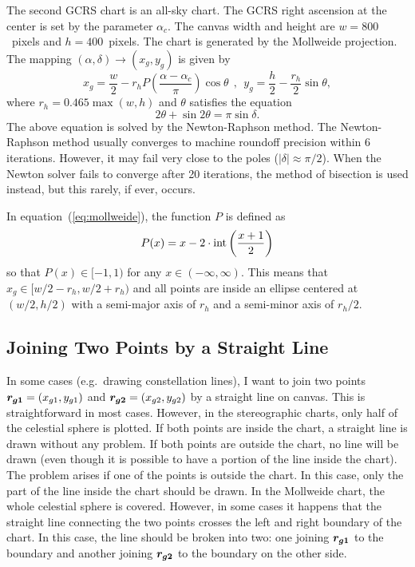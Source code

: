 \documentclass[12pt]{article}
\newcommand \beq {\begin{equation}}
\newcommand \eeq {\end{equation}}
\newcommand{\ve}[1]{\mbox{\boldmath $#1$}}
\begin{document}
The second GCRS chart is an all-sky chart. The GCRS right ascension at the center 
is set by the parameter $\alpha_c$. The canvas width and height are $w=800$~pixels 
and $h=400$~pixels. The chart is generated by the Mollweide 
projection. The mapping $(\alpha, \delta) \rightarrow (x_g,y_g)$ is given by 
\beq
  x_g = \frac{w}{2} - r_h P\left( \frac{\alpha-\alpha_c}{\pi}\right) \cos \theta 
\ \ , \ \ y_g = \frac{h}{2} - \frac{r_h}{2} \sin \theta , 
\label{eq:mollweide}
\eeq
where $r_h = 0.465\max(w,h)$ and $\theta$ satisfies the equation 
\beq
  2\theta + \sin 2\theta = \pi \sin \delta .
\eeq 
The above equation is solved by the Newton-Raphson method. The Newton-Raphson 
method usually converges to machine roundoff precision within 6 iterations. 
However, it may fail very close to the poles ($|\delta|\approx \pi/2$). 
When the Newton solver fails to converge after 20 iterations, the method 
of bisection is used instead, but this rarely, if ever, occurs.

In equation~(\ref{eq:mollweide}), the function $P$ is defined as 
\beq
  P(x) = x - 2 \cdot {\rm int}\left( \frac{x+1}{2} \right) 
\eeq
so that $P(x) \in [-1,1)$ for any $x\in (-\infty, \infty)$.
This means that $x_g \in [w/2 - r_h, w/2 + r_h)$ and all points are inside 
an ellipse centered at $(w/2,h/2)$ with a semi-major axis of $r_h$ and 
a semi-minor axis of $r_h/2$.

\subsection{Joining Two Points by a Straight Line}

In some cases (e.g.\ drawing constellation lines), I want to join 
two points $\ve{r_{g1}}=(x_{g1},y_{g1})$ 
and $\ve{r_{g2}}=(x_{g2},y_{g2})$ by a straight line on canvas. 
This is straightforward in most cases. However, 
in the stereographic charts, only half of the celestial sphere is plotted. 
If both points are inside the chart, a straight line is drawn without any 
problem. If both points are outside the chart, no line will be drawn (even 
though it is possible to have a portion of the line inside the chart). 
The problem arises if one of the points is outside the chart. In this case, 
only the part of the line inside the chart should be drawn. In the Mollweide 
chart, the whole celestial sphere is covered. However, in some cases it happens 
that the straight line connecting the two points crosses the left and right 
boundary of the chart. In this case, the line should be broken into two: one 
joining $\ve{r_{g1}}$ to the boundary and another joining $\ve{r_{g2}}$ to the 
boundary on the other side. 
\end{document}

